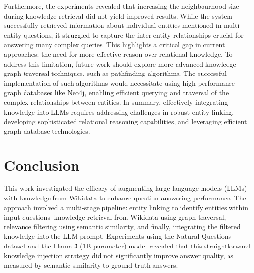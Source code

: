 \documentclass{article}
\begin{document}
Furthermore, the experiments revealed that increasing the neighbourhood size during knowledge retrieval did not yield improved results. While the system successfully retrieved information about individual entities mentioned in multi-entity questions, it struggled to capture the inter-entity relationships crucial for answering many complex queries. This highlights a critical gap in current approaches: the need for more effective reason over relational knowledge. To address this limitation, future work should explore more advanced knowledge graph traversal techniques, such as pathfinding algorithms. The successful implementation of such algorithms would necessitate using high-performance graph databases like Neo4j, enabling efficient querying and traversal of the complex relationships between entities. In summary, effectively integrating knowledge into LLMs requires addressing challenges in robust entity linking, developing sophisticated relational reasoning capabilities, and leveraging efficient graph database technologies.

\section{Conclusion}

This work investigated the efficacy of augmenting large language models (LLMs) with knowledge from Wikidata to enhance question-answering performance. The approach involved a multi-stage pipeline: entity linking to identify entities within input questions, knowledge retrieval from Wikidata using graph traversal, relevance filtering using semantic similarity, and finally, integrating the filtered knowledge into the LLM prompt. Experiments using the Natural Questions dataset and the Llama 3 (1B parameter) model revealed that this straightforward knowledge injection strategy did not significantly improve answer quality, as measured by semantic similarity to ground truth answers. 


\printbibliography
\end{document}
